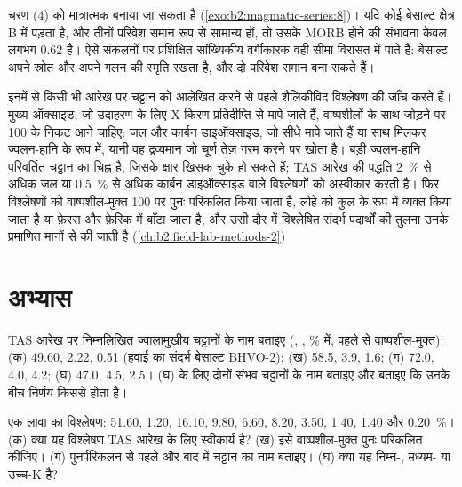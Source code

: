 चरण (4) को मात्रात्मक बनाया जा सकता है (\cref{exo:b2:magmatic-series:8})। यदि कोई बेसाल्ट क्षेत्र B में पड़ता है, और
तीनों परिवेश समान रूप से सामान्य हों, तो उसके MORB होने की संभावना केवल लगभग 0.62 है।
ऐसे संकलनों पर प्रशिक्षित सांख्यिकीय वर्गीकारक वही सीमा विरासत में पाते हैं: बेसाल्ट
अपने स्रोत और अपने गलन की स्मृति रखता है, और दो परिवेश समान
 बना सकते हैं।

\begin{inthelab}[पूर्ण-चट्टान विश्लेषण की जाँच]
इनमें से किसी भी आरेख पर चट्टान को आलेखित करने से पहले शैलिकीविद विश्लेषण की जाँच करते हैं।
मुख्य ऑक्साइड, जो उदाहरण के लिए X-किरण प्रतिदीप्ति से मापे जाते हैं, वाष्पशीलों के साथ जोड़ने पर 100 के निकट
आने चाहिए: जल और कार्बन डाइऑक्साइड, जो सीधे मापे जाते हैं या साथ मिलकर
ज्वलन-हानि के रूप में, यानी वह द्रव्यमान जो चूर्ण तेज़ गरम करने पर खोता है। बड़ी ज्वलन-हानि
परिवर्तित चट्टान का चिह्न है, जिसके क्षार खिसक चुके हो सकते हैं; TAS
आरेख की पद्धति \qty{2}{\percent} से अधिक जल या
\qty{0.5}{\percent} से अधिक कार्बन डाइऑक्साइड वाले विश्लेषणों को अस्वीकार करती है। फिर विश्लेषणों को वाष्पशील-मुक्त 100 पर
पुनः परिकलित किया जाता है, लोहे को कुल  के रूप में व्यक्त किया जाता है या फ़ेरस और फ़ेरिक में बाँटा जाता है,
और उसी दौर में विश्लेषित संदर्भ पदार्थों की तुलना उनके प्रमाणित
मानों से की जाती है (\cref{ch:b2:field-lab-methods-2})।
\end{inthelab}

\section{अभ्यास}

\begin{exercise}[$\star$]\label{exo:b2:magmatic-series:1}
TAS आरेख पर निम्नलिखित ज्वालामुखीय चट्टानों के नाम बताइए (, , 
\unit{\percent} में, पहले से वाष्पशील-मुक्त): (क) 49.60, 2.22, 0.51 (हवाई का
संदर्भ बेसाल्ट BHVO-2); (ख) 58.5, 3.9, 1.6; (ग) 72.0, 4.0, 4.2; (घ) 47.0, 4.5, 2.5।
(घ) के लिए दोनों संभव चट्टानों के नाम बताइए और बताइए कि उनके बीच निर्णय किससे होता है।
\end{exercise}

\begin{exercise}[$\star$]\label{exo:b2:magmatic-series:2}
एक लावा का विश्लेषण:  51.60,  1.20,  16.10,  9.80,
 6.60,  8.20,  3.50,  1.40,  1.40 और
 \qty{0.20}{\percent}। (क) क्या यह विश्लेषण TAS आरेख के लिए स्वीकार्य है?
(ख) इसे वाष्पशील-मुक्त पुनः परिकलित कीजिए। (ग) पुनर्परिकलन से पहले और बाद में चट्टान का
नाम बताइए। (घ) क्या यह निम्न-, मध्यम- या उच्च-K है?
\end{exercise}

